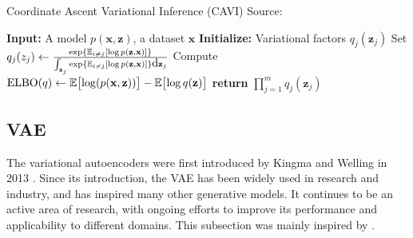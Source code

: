 \begin{algorithm}
    \caption[CAVI algorithm]{Coordinate Ascent Variational Inference (CAVI) Source: \cite{intro-variational-blog-2019}}
    \label{alg:cavi}
    \begin{algorithmic}[2]
      \State \textbf{Input:} A model $p(\mathbf{x},\mathbf{z})$, a dataset $\mathbf{x}$
      \State \textbf{Initialize:} Variational factors $q_j(\mathbf{z}_j)$
          \State Set $q_j(z_j) \gets \frac{\exp{\operatorname{\mathbb{E}}_{i \neq j} [\log p(\mathbf{z},\mathbf{x})]}}{\int_{\mathbf{z}_j}\exp{\operatorname{\mathbb{E}}_{i \neq j} [\log p(\mathbf{z},\mathbf{x})]}\mbox{\rm d}\mathbf{z}_j}$
        \EndFor
        \State Compute $\mathrm{ELBO}(q) \gets \operatorname{\mathbb{E}} \bigl[\log(p(\mathbf{x},\mathbf{z}))\bigr] - \operatorname{\mathbb{E}} \bigl[ \log q(\mathbf{z}) \bigr]$
      \EndWhile
      \State \textbf{return} $\prod_{j=1}^m q_j(\mathbf{z}_j)$
    \end{algorithmic}
\end{algorithm}

\subsection{VAE}
\label{subsec:vaes}
The variational autoencoders were first introduced by Kingma and Welling in 2013 \cite{vae-original-2013}. Since its introduction, the VAE 
has been widely used in research and industry, and has inspired many other generative models. It continues to be an active area of research, with 
ongoing efforts to improve its performance and applicability to different domains. This subsection was mainly inspired by \cite{intro-vae-2019}.

